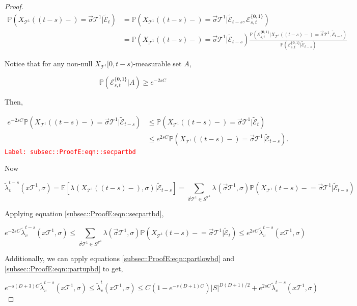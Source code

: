 \documentclass[12pt]{article}
\newcommand{\mb}{\mathbb}
\newcommand{\mc}{\mathcal}
\newcommand{\tr}{\textcolor{red}}
\newcommand{\labe}[1]{\tr{\texttt{Label: #1}}}
\newcommand{\pr}{\mb{P}}							%
\newcommand{\ex}[1]{\mb{E}\left[#1\right]}			%
\renewcommand{\root}{\mathbf{0}}				%
\renewcommand{\v}{v}							%
\renewcommand{\S}{S}							%
\newcommand{\s}{\sigma}							%
\newcommand{\sv}{\vec{\s}}						%
\newcommand{\x}{x}								%
\renewcommand{\t}{t}							%
\renewcommand{\tt}{s}							%
\newcommand{\degr}{D}								%
\newcommand{\pup}[1]{^{#1}}							%
\newcommand{\tree}{\mc{T}}							%
\newcommand{\XState}[1]{\S^{#1}}				%
\newcommand{\rxvt}[2]{X_{#1}{(#2)}}					%
\newcommand{\rxvts}[2]{X_{#1}{#2}}					%
\newcommand{\rate}[1]{\lambda_{#1}}					%
\newcommand{\crate}[2]{\alt{\lambda}_{#1}^{#2}}		%
\newcommand{\const}[1]{C_{#1}}						%
\newcommand{\alt}{\widetilde}						%
\newcommand{\evnt}{\mc{E}}						%
\newcommand{\typset}{A}							%
\begin{document}
\begin{proof}
\begin{align*}
\pr\left(\rxvt{\tree\pup{1}}{(\t-\tt)-}=\sv{}{\tree\pup{1}}|\alt{\evnt}_\t\right) &= \pr\left(\rxvt{\tree\pup{1}}{(\t-\tt)-}=\sv{}{\tree\pup{1}}|\alt{\evnt}_{\t-\tt},\evnt^{\{\root,1\}}_{\tt,\t}\right)\\
&=\pr\left(\rxvt{\tree\pup{1}}{(\t-\tt)-}=\sv{}{\tree\pup{1}}|\alt{\evnt}_{\t-\tt}\right)\frac{\pr\left(\evnt^{\{\root,1\}}_{\tt,\t}|\rxvt{\tree\pup{1}}{(\t-\tt)-}=\sv{}{\tree\pup{1}},\alt{\evnt}_{\t-\tt}\right)}{\pr\left(\evnt^{\{\root,1\}}_{\tt,\t}|\alt{\evnt}_{\t-\tt}\right)}
\end{align*}

Notice that for any non-null \(\rxvts{\tree\pup{1}}{[0,\t-\tt)}\)-measurable set \(\typset\), 

\[\pr(\evnt^{\{\root,1\}}_{\tt,\t}|\typset) \geq e^{-2\tt\const{}}\]

Then,

\begin{align}
e^{-2\tt\const{}}\pr\left(\rxvt{\tree\pup{1}}{(\t-\tt)-}=\sv{}{\tree\pup{1}}|\alt{\evnt}_{\t-\tt}\right) &\leq \pr\left(\rxvt{\tree\pup{1}}{(\t-\tt)-}=\sv{}{\tree\pup{1}}|\alt{\evnt}_{\t}\right)\nonumber\\
&\leq e^{2\tt\const{}}\pr\left(\rxvt{\tree\pup{1}}{(\t-\tt)-}=\sv{}{\tree\pup{1}}|\alt{\evnt}_{\t-\tt}\right).
\label{subsec::ProofE:eqn::secpartbd}
\end{align}
\labe{subsec::ProofE:eqn::secpartbd}

Now

\[\crate{\v}{\t-\tt}(\x{\tree\pup{1}}{},\s) = \ex{\rate{}(\rxvt{\tree\pup{1}}{(\t-\tt)-},\s)|\alt{\evnt}_{\t-\tt}} = \sum_{\sv{}{\tree\pup{1}}\in \S^{\tree\pup{1}}}\rate{}(\sv{}{\tree\pup{1}},\s)\pr\left(\rxvts{\tree\pup{1}}{(\t-\tt)-} = \sv{}{\tree\pup{1}}|\alt{\evnt}_{\t-\tt}\right)\]

Applying equation \eqref{subsec::ProofE:eqn::secpartbd},

\[e^{-2\tt\const{}}\crate{\v}{\t-\tt}(\x{\tree\pup{1}}{},\s) \leq \sum_{\sv{}{\tree\pup{1}}\in \S^{\tree\pup{1}}} \lambda(\sv{}{\tree\pup{1}},\s)\pr(\rxvts{\tree\pup{1}}{(\t-\tt)-} = \sv{}{\tree\pup{1}}|\alt{\evnt}_\t)\leq e^{2\tt\const{}}\crate{\v}{\t-\tt}(\x{\tree\pup{1}}{},\s)\]

Additionally, we can apply equations \eqref{subsec::ProofE:eqn::partlowbd} and  \eqref{subsec::ProofE:eqn::partupbd} to get,

\[e^{-\tt(\degr+3)\const{}}\crate{\v}{\t-\tt}(\x{\tree\pup{1}}{},\s) \leq \crate{\v}{\t}(\x{\tree\pup{1}}{},\s) \leq \const{}(1 - e^{-\tt(\degr+1)\const{}})|S|^{\degr(\degr+1)/2} + e^{2\tt\const{}}\crate{\v}{\t-\tt}(\x{\tree\pup{1}}{},\s)\]


\end{proof}
\end{document}
